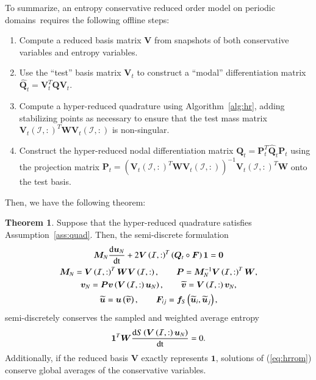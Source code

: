 \documentclass[preprint,10pt]{elsarticle}
\theoremstyle{definition}
\theoremstyle{lemma}
\theoremstyle{theorem}
\newtheorem{theorem}{Theorem}
\theoremstyle{assumption}
\renewcommand{\hat}{\widehat}
\renewcommand{\tilde}{\widetilde}
\newcommand{\td}[2]{\frac{{\rm d}#1}{{\rm d}{\rm #2}}}
\newcommand{\LRp}[1]{\left( #1 \right)}
\begin{document}
To summarize, an entropy conservative reduced order model on periodic domains requires the following offline steps:
\begin{enumerate}
\item Compute a reduced basis matrix $\bm{V}$ from snapshots of both conservative variables and entropy variables.  
\item Use the ``test'' basis matrix $\bm{V}_t$ to construct a ``modal'' differentiation matrix $\hat{\bm{Q}}_t = \bm{V}_t^T\bm{Q}\bm{V}_t$.
\item Compute a hyper-reduced quadrature using Algorithm~\ref{alg:hr}, adding stabilizing points as necessary to ensure that the test mass matrix $\bm{V}_t\LRp{\mathcal{I},:}^T\bm{W}\bm{V}_t\LRp{\mathcal{I},:}$ is non-singular.  
\item Construct the hyper-reduced nodal differentiation matrix $\bm{Q}_t = \bm{P}_t^T\hat{\bm{Q}}_t\bm{P}_t$ using the projection matrix $\bm{P}_t = \LRp{\bm{V}_t\LRp{\mathcal{I},:}^T\bm{W}\bm{V}_t\LRp{\mathcal{I},:}}^{-1}\bm{V}_t\LRp{\mathcal{I},:}^T\bm{W}$ onto the test basis.
\end{enumerate}
Then, we have the following theorem:
\begin{theorem}
Suppose that the hyper-reduced quadrature satisfies Assumption~\ref{ass:quad}.  Then, the semi-discrete formulation 
\begin{gather}
\bm{M}_N\td{\bm{u}_N}{t} + 2\bm{V}\LRp{\mathcal{I},:}^T\LRp{\bm{Q}_t \circ \bm{F}}\bm{1} = \bm{0} \label{eq:hrrom}\\
\bm{M}_N = \bm{V}\LRp{\mathcal{I},:}^T\bm{W}\bm{V}\LRp{\mathcal{I},:}, \qquad \bm{P} = \bm{M}_N^{-1}\bm{V}\LRp{\mathcal{I},:}^T\bm{W},\nonumber\\ 
\bm{v}_N = \bm{P}\bm{v}\LRp{\bm{V}\LRp{\mathcal{I},:}\bm{u}_N}, \qquad \tilde{\bm{v}} = \bm{V}\LRp{\mathcal{I},:}\bm{v}_N, \nonumber\\
\tilde{\bm{u}} = \bm{u}\LRp{\tilde{\bm{v}}}, \qquad \bm{F}_{ij} = \bm{f}_S\LRp{\tilde{\bm{u}}_i,\tilde{\bm{u}}_j},\nonumber
\end{gather}
semi-discretely conserves the sampled and weighted average entropy  
\[
\bm{1}^T\bm{W}\td{S\LRp{\bm{V}\LRp{\mathcal{I},:}\bm{u}_N}}{t} = 0.  
\]
Additionally, if the reduced basis $\bm{V}$ exactly represents $\bm{1}$, solutions of (\ref{eq:hrrom}) conserve global averages of the conservative variables.
\label{thm:hrromes}
\end{theorem}
\end{document}
